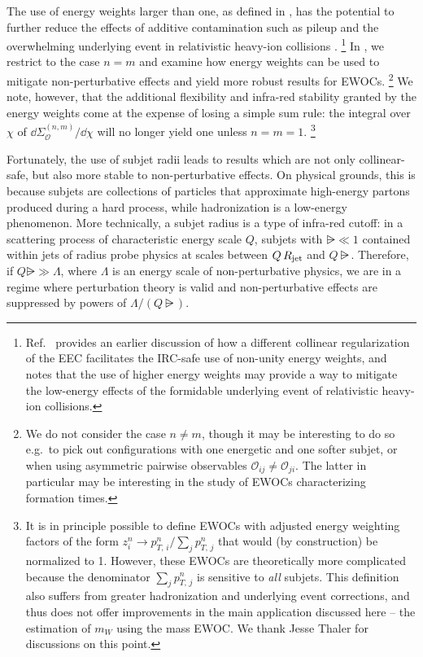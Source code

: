 The use of energy weights larger than one, as defined in , has the potential to further reduce the effects of additive contamination such as pileup and the overwhelming underlying event in relativistic heavy-ion collisions \cite{Barata:2023bhh}.%
\footnote{
    Ref.~\cite{Barata:2023bhh} provides an earlier discussion of how a different collinear regularization of the EEC facilitates the IRC-safe use of non-unity energy weights, and notes that the use of higher energy weights may provide a way to mitigate the low-energy effects of the formidable underlying event of relativistic heavy-ion collisions.
}
%
In , we restrict to the case \(n = m\) and examine how energy weights can be used to mitigate non-perturbative effects and yield more robust results for EWOCs.%
\footnote{
    We do not consider the case \(n \neq m\), though it may be interesting to do so e.g.~to pick out configurations with one energetic and one softer subjet, or when using asymmetric pairwise observables \(\mathcal{O}_{ij} \neq \mathcal{O}_{ji}\).
    The latter in particular may be interesting in the study of EWOCs characterizing formation times.
}
%
We note, however, that the additional flexibility and infra-red stability granted by the energy weights come at the expense of losing a simple sum rule:
%
the integral over $\chi$ of \(
    \dd \Sigma^{(n,m)}_\mathcal{O} / \dd \chi
\) will no longer yield one unless \(n = m = 1\).%
\footnote{
    It is in principle possible to define EWOCs with adjusted energy weighting factors of the form \(z_i^n \to p_{T,\,i}^n / \sum_j p_{T,\,j}^n\) that would (by construction) be normalized to 1.
    However, these EWOCs are theoretically more complicated because the denominator $\sum_j p_{T,\,j}^n$ is sensitive to \emph{all} subjets. This definition also suffers from greater hadronization and underlying event corrections, and thus does not offer improvements in the main application discussed here -- the estimation of \(m_W\) using the mass EWOC.
    We thank Jesse Thaler for discussions on this point.
}


Fortunately, the use of subjet radii leads to results which are not only collinear-safe, but also more stable to non-perturbative effects.
%
On physical grounds, this is because subjets are collections of particles that approximate high-energy partons produced during a hard process, while hadronization is a low-energy phenomenon.
%
More technically, a subjet radius is a type of infra-red cutoff:
%
in a scattering process of characteristic energy scale \(Q\), subjets with \(\rsub\ll 1\) contained within jets of radius \Rjet{} probe physics at scales between \(Q\,R_\text{jet}\) and \(Q\rsub\).
%
Therefore, if \(Q\rsub\gg\Lambda\), where \(\Lambda\) is an energy scale of non-perturbative physics, we are in a regime where perturbation theory is valid and non-perturbative effects are suppressed by powers of \(\Lambda/(Q\rsub)\).

